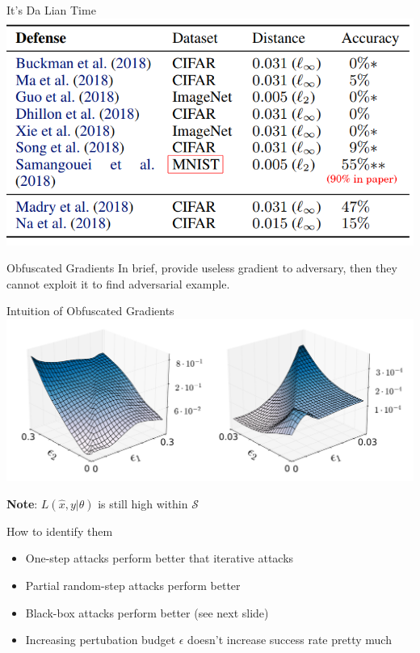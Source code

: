 \documentclass{beamer}
\begin{document}
\begin{frame}{It's Da Lian Time}
  \includegraphics[width=\textwidth]{fig/ob-grad/table.png}
\end{frame}

\begin{frame}{Obfuscated Gradients}
  In brief, provide useless gradient to adversary, then they cannot exploit it to find adversarial example.
\end{frame}

\begin{frame}{Intuition of Obfuscated Gradients}
  \includegraphics[width=\textwidth]{fig/ob-grad/effect-of-gradient-masking.png}

  \textbf{Note}: $L(\hat{x},y|\theta)$ is still high within $\mathcal{S}$
\end{frame}

\begin{frame}{How to identify them}
  \begin{itemize}
    \item One-step attacks perform better that iterative attacks
    \item Partial random-step attacks perform better
    \item Black-box attacks perform better (see next slide)
    \item Increasing pertubation budget $\epsilon$ doesn't increase success rate pretty much
  \end{itemize}
\end{frame}
\end{document}
